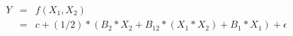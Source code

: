 

\[
\begin{array}{lll}Y & = & f(X_1,X_2) \\ & = & c + (1/2)*(B_2*X_2 + B_{12}*(X_1*X_2) + B_1*X_1) + \epsilon \end{array}

\]


